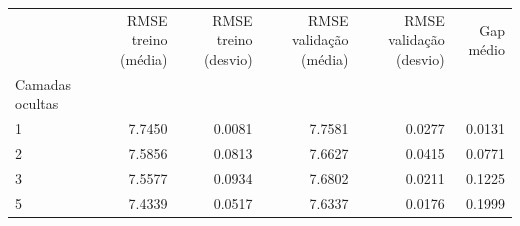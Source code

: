 \begin{tabular}{lrrrrr}
\toprule
 & RMSE treino (média) & RMSE treino (desvio) & RMSE validação (média) & RMSE validação (desvio) & Gap médio \\
Camadas ocultas &  &  &  &  &  \\
\midrule
1 & 7.7450 & 0.0081 & 7.7581 & 0.0277 & 0.0131 \\
2 & 7.5856 & 0.0813 & 7.6627 & 0.0415 & 0.0771 \\
3 & 7.5577 & 0.0934 & 7.6802 & 0.0211 & 0.1225 \\
5 & 7.4339 & 0.0517 & 7.6337 & 0.0176 & 0.1999 \\
\bottomrule
\end{tabular}
